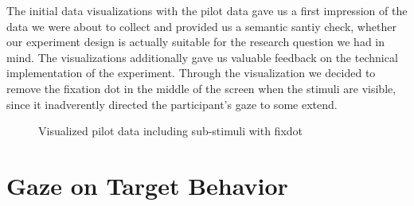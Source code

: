 \documentclass[
  12pt,
  letterpaper,
  DIV=11,
  numbers=noendperiod]{scrreprt}
\begin{document}
The initial data visualizations with the pilot data gave us a first
impression of the data we were about to collect and provided us a
semantic santiy check, whether our experiment design is actually
suitable for the research question we had in mind. The visualizations
additionally gave us valuable feedback on the technical implementation
of the experiment. Through the visualization we decided to remove the
fixation dot in the middle of the screen when the stimuli are visible,
since it inadverently directed the participant's gaze to some extend.

\begin{figure}


\caption{\label{fig-pilot}Visualized pilot data including sub-stimuli
with fixdot}

\end{figure}%

\section{Gaze on Target Behavior}\label{gaze-on-target-behavior}
\end{document}

